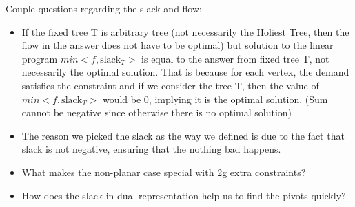 \documentclass{article}
\begin{document}
Couple questions regarding the slack and flow:
\begin{itemize}
\item If the fixed tree T is arbitrary tree (not necessarily the Holiest Tree, 
then the flow in the answer does not have to be optimal) but solution to the 
linear program $min <f, \text{slack}_T>$ is equal to the answer from fixed tree T, 
not necessarily the optimal solution. That is because for each vertex, the 
demand satisfies the constraint and if we consider the tree T, then the value of 
$min <f, \text{slack}_T>$ would be 0, implying it is the optimal solution. 
(Sum cannot be negative since otherwise there is no optimal solution)
\item The reason we picked the slack as the way we defined is due to the fact 
that slack is not negative, ensuring that the nothing bad happens.
\item What makes the non-planar case special with 2g extra constraints?
\item How does the slack in dual representation help us to find the pivots quickly?
\end{itemize}
\end{document}
